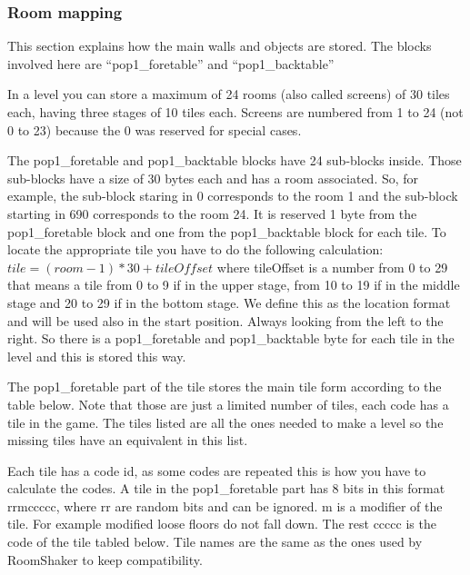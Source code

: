 \documentclass{article}
\begin{document}
\subsubsection{Room mapping\label{room mapping}} %
 This section explains how the main walls and objects are stored. The
 blocks involved here are ``pop1\_foretable'' and ``pop1\_backtable''

 In a level you can store a maximum of 24 rooms (also called screens) of 30
 tiles each, having three stages of 10 tiles each. Screens are numbered
 from 1 to 24 (not 0 to 23) because the 0 was reserved for special cases.

 The pop1\_foretable and pop1\_backtable blocks have 24 sub-blocks inside.
 Those sub-blocks have a size of 30 bytes each and has a room associated.
 So, for example, the sub-block staring in 0 corresponds to the room 1 and
 the sub-block starting in 690 corresponds to the room 24.
 It is reserved 1 byte from the pop1\_foretable block and one from the
 pop1\_backtable block for each tile. To locate the appropriate tile you
 have to do the following calculation: $tile=(room-1)*30+tileOffset$ where
 tileOffset is a number from 0 to 29 that means a tile from 0 to 9 if in
 the upper stage, from 10 to 19 if in the middle stage and 20 to 29 if in
 the bottom stage. We define this as the location format and will be used
 also in the start position.
 Always looking from the left to the right.
 So there is a pop1\_foretable and pop1\_backtable byte for each tile in the
 level and this is stored this way.

 The pop1\_foretable part of the tile stores the main tile form according to
 the table below. Note that those are just a limited number of tiles, each
 code has a tile in the game. The tiles listed are all the ones needed to
 make a level so the missing tiles have an equivalent in this list.

 Each tile has a code id, as some codes are repeated this is how you have
 to calculate the codes. A tile in the pop1\_foretable part has 8 bits in
 this format rrmccccc, where rr are random bits and can be ignored. m is a
 modifier of the tile. For example modified loose floors do not fall down.
 The rest ccccc is the code of the tile tabled below. Tile names are the
 same as the ones used by RoomShaker to keep compatibility.
\end{document}
